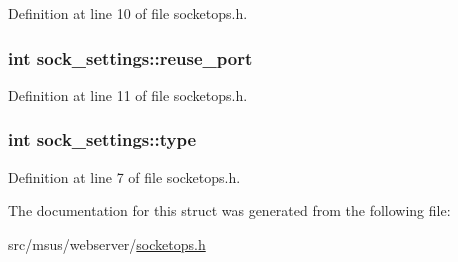 Definition at line 10 of file socketops.\-h.

\hypertarget{structsock__settings_a9c727193200daa5ef25f9a74e983de1f}{
\subsubsection[{reuse\-\_\-port}]{\setlength{\rightskip}{0pt plus 5cm}int sock\-\_\-settings\-::reuse\-\_\-port}}\label{structsock__settings_a9c727193200daa5ef25f9a74e983de1f}


Definition at line 11 of file socketops.\-h.

\hypertarget{structsock__settings_afbd04165a11524a3a0ff83702958398f}{
\subsubsection[{type}]{\setlength{\rightskip}{0pt plus 5cm}int sock\-\_\-settings\-::type}}\label{structsock__settings_afbd04165a11524a3a0ff83702958398f}


Definition at line 7 of file socketops.\-h.



The documentation for this struct was generated from the following file\-:\begin{DoxyCompactItemize}
\item 
src/msus/webserver/\hyperlink{socketops_8h}{socketops.\-h}\end{DoxyCompactItemize}
